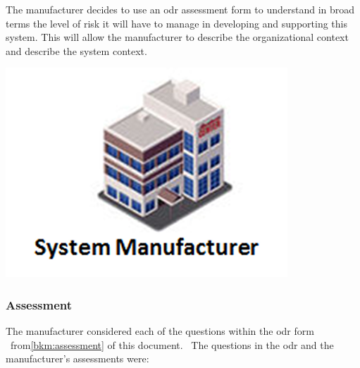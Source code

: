 %
%
\begin{minipage}[t][2cm]{0.73\textwidth}
  The manufacturer decides to use an \gls{odr} assessment form to understand in broad terms the level of risk it will have to manage in developing and supporting this system. This will allow the manufacturer to describe the organizational context and describe the system context.
\end{minipage}
\begin{minipage}[c][1cm]{0.25\textwidth}
	\vspace{1cm}
  \centering
    \includegraphics[width=\textwidth]{images/manufacturer}
\end{minipage}

\subsubsection{ Assessment}
The manufacturer considered each of the questions within the \gls{odr} form \cbstart\ from\cbend\autoref{bkm:assessment} of this document.
\cbstart\ The questions in the \gls{odr} and the manufacturer's assessments were:\cbend\


